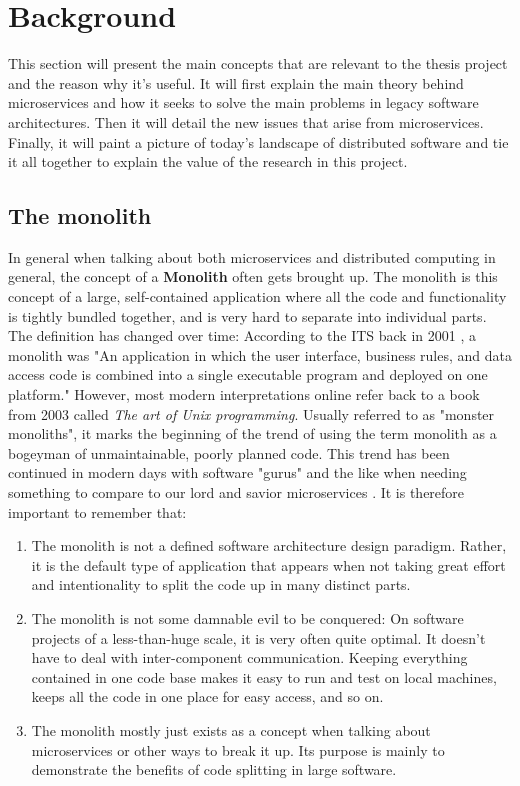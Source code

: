\chapter{Background}

\label{Chapter2}

This section will present the main concepts that are relevant to the thesis project and the reason why it's useful.
It will first explain the main theory behind microservices and how it seeks to solve the main problems in legacy software architectures. Then it will
detail the new issues that arise from microservices. Finally, it will paint a picture of today's landscape of distributed software and 
tie it all together to explain the value of the research in this project.

\section{The monolith}
In general when talking about both microservices and distributed computing in general, the concept of a \textbf{Monolith} often gets brought up. 
The monolith is this concept of a large, self-contained application where all the code and functionality is tightly bundled together, and is very hard to separate into individual parts.
The definition has changed over time: According to the ITS back in 2001 \cite{ITS}, a monolith was "An application in which the user interface, business rules, and data access code is combined into a single executable program and deployed on one platform."
However, most modern interpretations online refer back to a book from 2003 called \textit{The art of Unix programming}. Usually referred to as "monster monoliths", it marks the beginning of the trend of using the term monolith as a bogeyman of unmaintainable, poorly planned code. 
This trend has been continued in modern days with software "gurus" and the like when needing something to compare to our lord and savior microservices \cite*{Gouigoux2017}.
It is therefore important to remember that:
\begin{enumerate}
    \item The monolith is not a defined software architecture design paradigm. Rather, it is the default type of application that appears when not taking great effort and intentionality to split the code up in many distinct parts.
    \item The monolith is not some damnable evil to be conquered: On software projects of a less-than-huge scale, it is very often quite optimal. It doesn't have to deal with inter-component communication. Keeping everything contained in one code base makes it easy to run and test on local machines, keeps all the code in one place for easy access, and so on. 
    \item The monolith mostly just exists as a concept when talking about microservices or other ways to break it up. Its purpose is mainly to demonstrate the benefits of code splitting in large software.
\end{enumerate}

